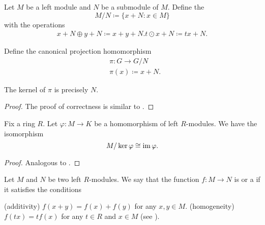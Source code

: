 \begin{definition}\label{def:quotient_left_module}
  Let \( M \) be a left module and \( N \) be a submodule of \( M \). Define the 
  \begin{equation*}
    M / N \coloneqq \{ x + N \colon x \in M \}
  \end{equation*}
  with the operations
  \begin{align*}
    x + N \oplus y + N \coloneqq x + y + N.
    t \odot x + N \coloneqq tx + N.
  \end{align*}

  Define the canonical projection homomorphism
  \begin{align*}
    &\pi: G \to G / N \\
    &\pi(x) \coloneqq x + N.
  \end{align*}

  The kernel of \( \pi \) is precisely \( N \).
\end{definition}
\begin{proof}
  The proof of correctness is similar to .
\end{proof}

\begin{theorem}\label{thm:homomorphism_theorem_for_left_modules}
  Fix a ring \( R \). Let \( \varphi: M \to K \) be a homomorphism of left \( R \)-modules. We have the isomorphism
  \begin{equation*}
    M / \ker \varphi \cong \operatorname{im} \varphi.
  \end{equation*}
\end{theorem}
\begin{proof}
  Analogous to .
\end{proof}

\begin{definition}\label{def:linear_operator}
  Let \( M \) and \( N \) be two left \( R \)-modules. We say that the function \( f: M \to N \) is  or a  if it satisfies the conditions
  \begin{defenum}
    (additivity) \( f(x + y) = f(x) + f(y) \) for any \( x, y \in M \).
    (homogeneity) \( f(tx) = t f(x) \) for any \( t \in R \) and \( x \in M \) (see ).
  \end{defenum}
\end{definition}

